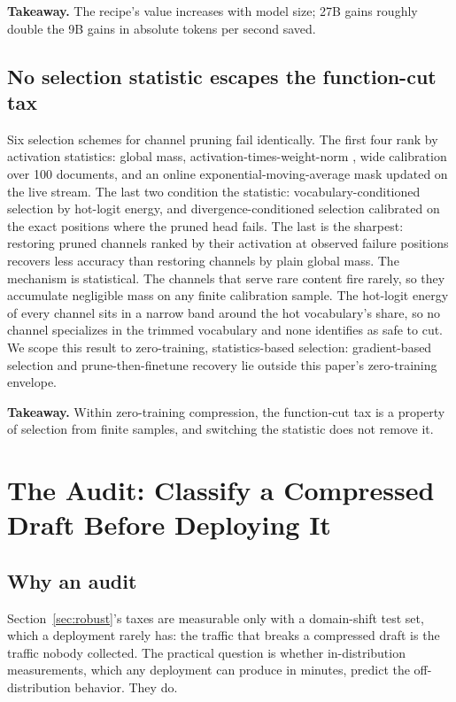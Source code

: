 \documentclass{article}
\begin{document}
\textbf{Takeaway.} The recipe's value increases with model size; 27B gains roughly double the 9B gains in absolute tokens per second saved.

\subsection{No selection statistic escapes the function-cut tax}
\label{sec:selection}

Six selection schemes for channel pruning fail identically. The first four rank by activation statistics: global mass, activation-times-weight-norm \cite{sun2023wanda}, wide calibration over 100 documents, and an online exponential-moving-average mask updated on the live stream. The last two condition the statistic: vocabulary-conditioned selection by hot-logit energy, and divergence-conditioned selection calibrated on the exact positions where the pruned head fails. The last is the sharpest: restoring pruned channels ranked by their activation at observed failure positions recovers less accuracy than restoring channels by plain global mass. The mechanism is statistical. The channels that serve rare content fire rarely, so they accumulate negligible mass on any finite calibration sample. The hot-logit energy of every channel sits in a narrow band around the hot vocabulary's share, so no channel specializes in the trimmed vocabulary and none identifies as safe to cut. We scope this result to zero-training, statistics-based selection: gradient-based selection and prune-then-finetune recovery lie outside this paper's zero-training envelope.

\textbf{Takeaway.} Within zero-training compression, the function-cut tax is a property of selection from finite samples, and switching the statistic does not remove it.

\section{The Audit: Classify a Compressed Draft Before Deploying It}
\label{sec:audit}

\subsection{Why an audit}
\label{sec:why-audit}

Section~\ref{sec:robust}'s taxes are measurable only with a domain-shift test set, which a deployment rarely has: the traffic that breaks a compressed draft is the traffic nobody collected. The practical question is whether in-distribution measurements, which any deployment can produce in minutes, predict the off-distribution behavior. They do.
\end{document}
